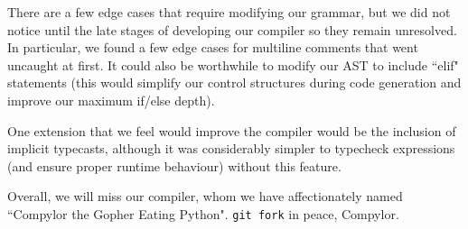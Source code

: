 \documentclass{article}
\begin{document}
There are a few edge cases that require modifying our grammar, but we did not notice until the late stages of developing our compiler so they remain unresolved. In particular, we found a few edge cases for multiline comments that went uncaught at first. It could also be worthwhile to modify our AST to include ``elif" statements (this would simplify our control structures during code generation and improve our maximum if/else depth).

One extension that we feel would improve the compiler would be the inclusion of implicit typecasts, although it was considerably simpler to typecheck expressions (and ensure proper runtime behaviour) without this feature.

Overall, we will miss our compiler, whom we have affectionately named ``Compylor the Gopher Eating Python". \lstinline|git fork| in peace, Compylor.
\end{document}
